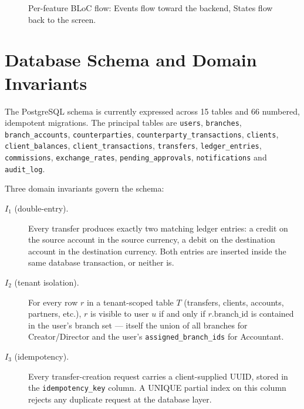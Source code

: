\begin{figure}[h]
  \centering
  \caption{Per-feature BLoC flow: Events flow toward the backend, States flow back to the screen.}
  \label{fig:bloc}
\end{figure}

\section{Database Schema and Domain Invariants}
\label{sec:schema}

The PostgreSQL schema is currently expressed across 15 tables and 66 numbered, idempotent migrations. The principal tables are \texttt{users}, \texttt{branches}, \texttt{branch\_accounts}, \texttt{counterparties}, \texttt{counterparty\_transactions}, \texttt{clients}, \texttt{client\_balances}, \texttt{client\_transactions}, \texttt{transfers}, \texttt{ledger\_entries}, \texttt{commissions}, \texttt{exchange\_rates}, \texttt{pending\_approvals}, \texttt{notifications} and \texttt{audit\_log}.

Three domain invariants govern the schema:

\begin{description}
  \item[$I_1$ (double-entry).] Every transfer produces exactly two matching ledger entries: a credit on the source account in the source currency, a debit on the destination account in the destination currency. Both entries are inserted inside the same database transaction, or neither is.
  \item[$I_2$ (tenant isolation).] For every row $r$ in a tenant-scoped table $T$ (transfers, clients, accounts, partners, etc.), $r$ is visible to user $u$ if and only if $r.\text{branch\_id}$ is contained in the user's branch set --- itself the union of all branches for Creator/Director and the user's \texttt{assigned\_branch\_ids} for Accountant.
  \item[$I_3$ (idempotency).] Every transfer-creation request carries a client-supplied UUID, stored in the \texttt{idempotency\_key} column. A UNIQUE partial index on this column rejects any duplicate request at the database layer.
\end{description}


